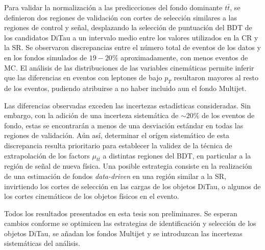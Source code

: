 Para validar la normalización a las prediccciones del fondo dominante $t\bar{t}$, se definieron dos regiones de validación con cortes de selección similares a las regiones de control y señal, desplazando la selección de puntuación del BDT de los candidatos DiTau a un intervalo medio entre los valores utilizados en la CR y la SR. Se observaron discrepancias entre el número total de eventos de los datos y en los fondos simulados de $19-20\%$ aproximadamente, con menos eventos de MC. El análisis de las distribuciones de las variables cinemáticas permite inferir que las diferencias en eventos con leptones de bajo $p_T$ resultaron mayores al resto de los eventos, pudiendo atribuirse a no haber incluido aun el fondo Multijet.

Las diferencias observadas exceden las incertezas estadísticas consideradas. Sin embargo, con la adición de una incerteza sistemática de $\sim 20\%$ de los eventos de fondo, estas se encontrarán a menos de una desviación estándar en todas las regiones de validación. Aún así, determinar el orígen sistemático de esta discrepancia resulta prioritario para establecer la validez de la técnica de extrapolación de los factors $\mu_{t\bar{t}}$ a distintas regiones del BDT, en particular a la región de señal de nueva física. Una posible estrategia consiste en la realización de una estimación de fondos \textit{data-driven} en una región similar a la SR, invirtiendo los cortes de selección en las cargas de los objetos DiTau, o algunos de los cortes cinemáticos de los objetos físicos en el evento.

Todos los resultados presentados en esta tesis son preliminares. Se esperan cambios conforme se optimicen las estrategias de identificación y selección de los objetos DiTau, se añadan los fondos Multijet y se introduzcan las incertezas sistemáticas del análisis.

\cleardoublepage{}